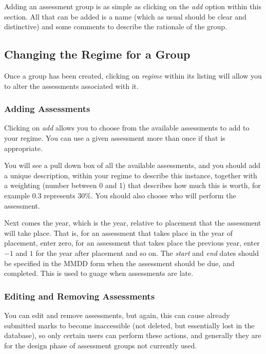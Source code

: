 \documentclass[12 pt]{book}
\begin{document}
Adding an assessment group is as simple as clicking on the \emph{add} option
within this section. All that can be added is a name (which as usual should be
clear and distinctive) and some comments to describe the rationale of the
group.

\subsection{Changing the Regime for a Group}

Once a group has been created, clicking on \emph{regime} within its listing
will allow you to alter the assessments associated with it.


\subsubsection{Adding Assessments}

Clicking on \emph{add} allows you to choose from the available assessments to
add to your regime. You can use a given assessment more than once if that is
appropriate.

You will see a pull down box of all the available assessments, and you should
add a unique description, within your regime to describe this instance,
together with a weighting (number between 0 and 1) that describes how much this
is worth, for example 0.3 represents $30\%$. You should also choose who will
perform the assessment.

Next comes the year, which is the year, relative to placement that the
assessment will take place. That is, for an assessment that takes place in the
year of placement, enter zero, for an assessment that takes place the previous
year, enter $-1$ and $1$ for the year after placement and so on. The
\emph{start} and \emph{end} dates should be specified in the MMDD form when
the assessment should be due, and completed. This is used to guage when 
assessments are late.

\subsubsection{Editing and Removing Assessments}

You can edit and remove assessments, but again, this can cause already submitted
marks to become inaccessible (not deleted, but essentially lost in the database),
so only certain users can perform these actions, and generally they are for the
design phase of assessment groups not currently used.
\end{document}
